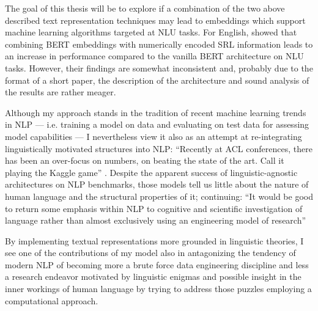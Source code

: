 The goal of this thesis will be to explore if a combination of the two above described text
representation techniques may lead to embeddings which support machine learning algorithms
targeted at NLU tasks. For English, \cite{zhang2019semantics} showed that combining BERT
embeddings with numerically encoded SRL information leads to an increase in performance
compared to the vanilla BERT architecture on NLU tasks. However, their findings are somewhat
inconsistent and, probably due to the format of a short paper, the description of the
architecture and sound analysis of the results are {\color{red} rather meager.}

Although my approach stands in the tradition of recent machine learning trends in NLP --- i.e.
training a model on data and evaluating on test data for assessing model capabilities --- I
nevertheless view it also as an attempt at re-integrating linguistically motivated structures
into NLP: ``Recently at ACL conferences, there has been an over-focus on numbers, on beating the
state of the art. Call it playing the Kaggle game'' \citep[p.~702]{manning2015computational}.
Despite the apparent success of linguistic-agnostic architectures on NLP benchmarks, those
models tell us little about the nature of human language and the structural properties of it;
\citeauthor{manning2015computational} continuing: ``It would be good to return some emphasis
within NLP to cognitive and scientific investigation of language rather than almost exclusively
using an engineering model of research'' \citep[p.~706]{manning2015computational}

By implementing textual representations more grounded in linguistic theories, I see one of
the contributions of my model also in antagonizing the tendency of modern NLP of becoming
more a brute force data engineering discipline and less a research endeavor motivated by
linguistic enigmas and possible insight in the inner workings of human language by trying
to address those puzzles employing a computational approach.


